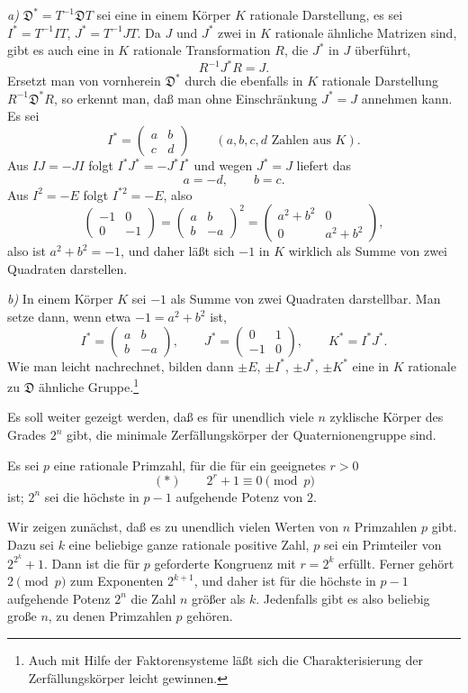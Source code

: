 \documentclass[11pt]{article}
\newcommand{\mat}[1]{\begin{pmatrix}#1\end{pmatrix}}
\begin{document}
\emph{a)} $\mathfrak{D}^*=T^{-1}\mathfrak{D}T$ sei eine in einem Körper $K$ rationale Darstellung, es sei $I^*=T^{-1}IT$, $J^*=T^{-1}JT$. Da $J$ und $J^*$ zwei in $K$ rationale ähnliche Matrizen sind, gibt es auch eine in $K$ rationale Transformation $R$, die $J^*$ in $J$ überführt,
\[
        R^{-1}J^*R=J.
\]
Ersetzt man von vornherein $\mathfrak{D}^*$ durch die ebenfalls in $K$ rationale Darstellung $R^{-1}\mathfrak{D}^*R$, so erkennt man, daß man ohne Einschränkung $J^*=J$ annehmen kann. Es sei
\[
        I^*=\mat{a&b\\ c&d}\qquad (a,b,c,d\text{ Zahlen aus }K).
\]
Aus $IJ=-JI$ folgt $I^*J^*=-J^*I^*$ und wegen $J^*=J$ liefert das
\[
        a=-d,
        \qquad b=c.
\]
Aus $I^2=-E$ folgt $I^{*2}=-E$, also
\[
        \mat{-1&0\\0&-1}=\mat{a&b\\ b&-a}^2
        =\mat{a^2+b^2&0\\0&a^2+b^2},
\]
also ist $a^2+b^2=-1$, und daher läßt sich $-1$ in $K$ wirklich als Summe von zwei Quadraten darstellen.

\emph{b)} In einem Körper $K$ sei $-1$ als Summe von zwei Quadraten darstellbar. Man setze dann, wenn etwa $-1=a^2+b^2$ ist,
\[
        I^*=\mat{a&b\\ b&-a},\qquad
        J^*=\mat{0&1\\-1&0},\qquad
        K^*=I^*J^*.
\]
Wie man leicht nachrechnet, bilden dann $\pm E$, $\pm I^*$, $\pm J^*$, $\pm K^*$ eine in $K$ rationale zu $\mathfrak{D}$ ähnliche Gruppe.\footnote{Auch mit Hilfe der Faktorensysteme läßt sich die Charakterisierung der Zerfällungskörper leicht gewinnen.}

Es soll weiter gezeigt werden, daß es für unendlich viele $n$ zyklische Körper des Grades $2^n$ gibt, die minimale Zerfällungskörper der Quaternionengruppe sind.

Es sei $p$ eine rationale Primzahl, für die für ein geeignetes $r>0$
\[
        (*)\qquad 2^r+1\equiv0\pmod p
\]
ist; $2^n$ sei die höchste in $p-1$ aufgehende Potenz von $2$.

Wir zeigen zunächst, daß es zu unendlich vielen Werten von $n$ Primzahlen $p$ gibt. Dazu sei $k$ eine beliebige ganze rationale positive Zahl, $p$ sei ein Primteiler von $2^{2^k}+1$. Dann ist die für $p$ geforderte Kongruenz mit $r=2^k$ erfüllt. Ferner gehört $2\pmod p$ zum Exponenten $2^{k+1}$, und daher ist für die höchste in $p-1$ aufgehende Potenz $2^n$ die Zahl $n$ größer als $k$. Jedenfalls gibt es also beliebig große $n$, zu denen Primzahlen $p$ gehören.
\end{document}
